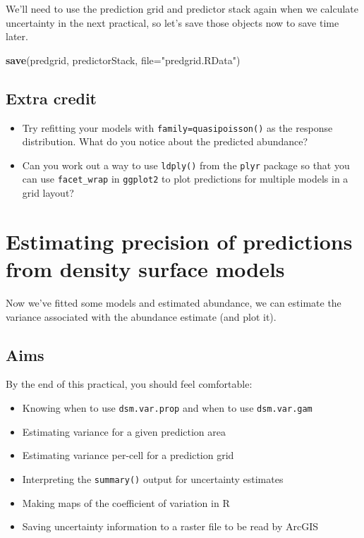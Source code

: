 \documentclass[]{book}
\newenvironment{Shaded}{\begin{snugshade}}{\end{snugshade}}
\newcommand{\KeywordTok}[1]{\textcolor[rgb]{0.13,0.29,0.53}{\textbf{#1}}}
\newcommand{\DataTypeTok}[1]{\textcolor[rgb]{0.13,0.29,0.53}{#1}}
\newcommand{\StringTok}[1]{\textcolor[rgb]{0.31,0.60,0.02}{#1}}
\newcommand{\NormalTok}[1]{#1}
\providecommand{\tightlist}{%
  \setlength{\itemsep}{0pt}\setlength{\parskip}{0pt}}
\theoremstyle{definition}
\theoremstyle{definition}
\theoremstyle{remark}
\begin{document}
We'll need to use the prediction grid and predictor stack again when we
calculate uncertainty in the next practical, so let's save those objects
now to save time later.

\begin{Shaded}
\begin{Highlighting}[]
\KeywordTok{save}\NormalTok{(predgrid, predictorStack, }\DataTypeTok{file=}\StringTok{"predgrid.RData"}\NormalTok{)}
\end{Highlighting}
\end{Shaded}

\section{Extra credit}\label{extra-credit-1}

\begin{itemize}
\tightlist
\item
  Try refitting your models with \texttt{family=quasipoisson()} as the
  response distribution. What do you notice about the predicted
  abundance?
\item
  Can you work out a way to use \texttt{ldply()} from the \texttt{plyr}
  package so that you can use \texttt{facet\_wrap} in \texttt{ggplot2}
  to plot predictions for multiple models in a grid layout?
\end{itemize}

\chapter{Estimating precision of predictions from density surface
models}\label{estimating-precision-of-predictions-from-density-surface-models}

Now we've fitted some models and estimated abundance, we can estimate
the variance associated with the abundance estimate (and plot it).

\section{Aims}\label{aims-5}

By the end of this practical, you should feel comfortable:

\begin{itemize}
\tightlist
\item
  Knowing when to use \texttt{dsm.var.prop} and when to use
  \texttt{dsm.var.gam}
\item
  Estimating variance for a given prediction area
\item
  Estimating variance per-cell for a prediction grid
\item
  Interpreting the \texttt{summary()} output for uncertainty estimates
\item
  Making maps of the coefficient of variation in R
\item
  Saving uncertainty information to a raster file to be read by ArcGIS
\end{itemize}
\end{document}
